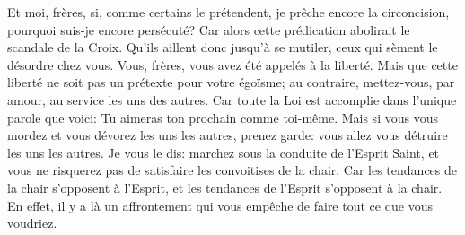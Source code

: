 Et moi, frères, si, comme certains le prétendent, je prêche encore la circoncision,
	pourquoi suis-je encore persécuté?
Car alors cette prédication abolirait le scandale de la Croix.
Qu’ils aillent donc jusqu’à se mutiler, ceux qui sèment le désordre chez vous.
Vous, frères, vous avez été appelés à la liberté.
Mais que cette liberté ne soit pas un prétexte pour votre égoïsme;
	au contraire, mettez-vous, par amour, au service les uns des autres.
Car toute la Loi est accomplie dans l’unique parole que voici:
	Tu aimeras ton prochain comme toi-même.
Mais si vous vous mordez et vous dévorez les uns les autres, prenez garde:
	vous allez vous détruire les uns les autres.
Je vous le dis: marchez sous la conduite de l’Esprit Saint,
	et vous ne risquerez pas de satisfaire les convoitises de la chair.
Car les tendances de la chair s’opposent à l’Esprit,
	et les tendances de l’Esprit s’opposent à la chair.
En effet, il y a là un affrontement qui vous empêche de faire tout ce que vous voudriez.
